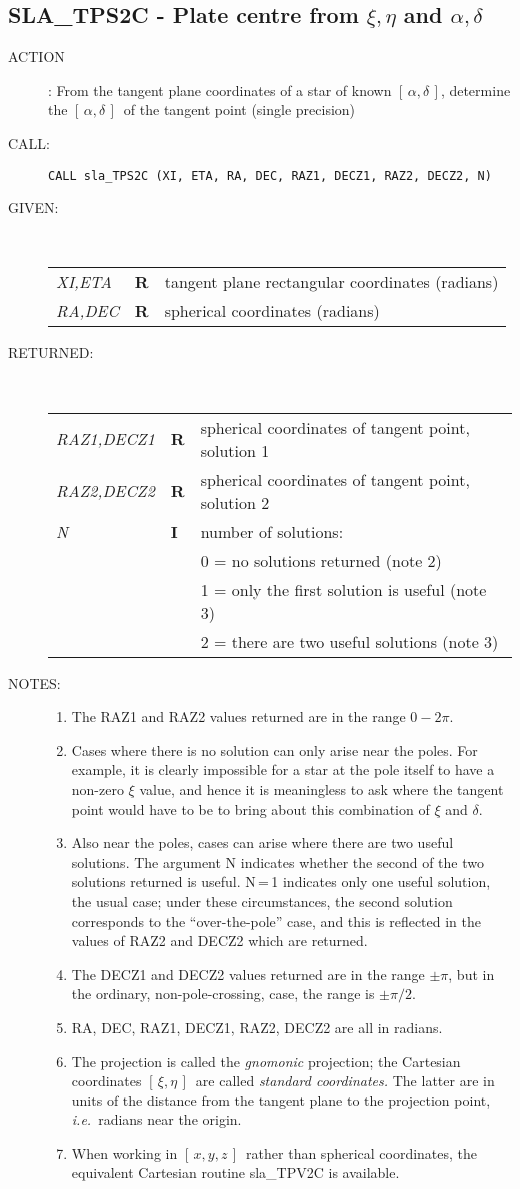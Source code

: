 \documentclass[11pt,twoside]{article}
\newcommand{\xlabel}[1]{}
\newcommand{\radec}     {$[\,\alpha,\delta\,]$}
\newcommand{\xieta}     {$[\,\xi,\eta\,]$}
\newcommand{\xyz}       {$[\,x,y,z\,]$}
\newcommand{\routine}[3]
{\hbadness=10000
  \vbox
  {
    \rule{\textwidth}{0.3mm}\\
    {\Large {\bf #1} \hfill #2 \hfill {\bf #1}}\\
    \setlength{\oldspacing}{\topsep}
    \setlength{\topsep}{0.3ex}
    \begin{description}
      #3
    \end{description}
    \setlength{\topsep}{\oldspacing}
  }
}
\renewcommand{\routine}[3]
   {
      \subsection{#1\xlabel{#1} - #2\label{#1}}
       \begin{description}
         #3
       \end{description}
   }
\newcommand{\action}[1]
{\item[ACTION]: #1}
\newcommand{\action}[1]
   {\item[ACTION:] #1}
\newcommand{\call}[1]
{\item[CALL]: \hspace{0.4em}{\tt #1}}
\newlength{\oldspacing}
\renewcommand{\call}[1]
   {
    \item[CALL:] {\tt #1}
   }
\newcommand{\args}[2]
{
  \goodbreak
  \setlength{\oldspacing}{\topsep}
  \setlength{\topsep}{0.3ex}
  \begin{description}
  \item[#1]:\\[1.5ex]
    \begin{tabular}{p{7em}p{6em}p{22em}}
      #2
    \end{tabular}
  \end{description}
  \setlength{\topsep}{\oldspacing}
}
\renewcommand{\args}[2]
   {
     \begin{description}
        \item[#1:]\\
        \begin{tabular}{p{7em}p{6em}l}
           #2
        \end{tabular}
     \end{description}
   }
\newcommand{\spec}[3]
{
  {\em {#1}} & {\bf \mbox{#2}} & {#3}
}
\newcommand{\notes}[1]
{
  \goodbreak
  \setlength{\oldspacing}{\topsep}
  \setlength{\topsep}{0.3ex}
  \begin{description}
    \item[NOTES]:
        #1
  \end{description}
  \setlength{\topsep}{\oldspacing}
}
\renewcommand{\notes}[1]
   {
      \begin{description}
         \item[NOTES:]
            #1
      \end{description}
   }
\begin{document}
\routine{SLA\_TPS2C}{Plate centre from $\xi,\eta$ and $\alpha,\delta$}
{
 \action{From the tangent plane coordinates of a star of known \radec,
        determine the \radec\ of the tangent point (single precision)}
 \call{CALL sla\_TPS2C (XI, ETA, RA, DEC, RAZ1, DECZ1, RAZ2, DECZ2, N)}
}
\args{GIVEN}
{
 \spec{XI,ETA}{R}{tangent plane rectangular coordinates (radians)} \\
 \spec{RA,DEC}{R}{spherical coordinates (radians)}
}
\args{RETURNED}
{
 \spec{RAZ1,DECZ1}{R}{spherical coordinates of tangent point,
                      solution 1} \\
 \spec{RAZ2,DECZ2}{R}{spherical coordinates of tangent point,
                      solution 2} \\
 \spec{N}{I}{number of solutions:} \\
 \spec{}{}{\hspace{1em} 0 = no solutions returned  (note 2)} \\
 \spec{}{}{\hspace{1em} 1 = only the first solution is useful (note 3)} \\
 \spec{}{}{\hspace{1em} 2 = there are two useful solutions (note 3)}
}
\notes
{
 \begin{enumerate}
  \item The RAZ1 and RAZ2 values returned are in the range $0\!-\!2\pi$.
  \item Cases where there is no solution can only arise near the poles.
        For example, it is clearly impossible for a star at the pole
        itself to have a non-zero $\xi$ value, and hence it is
        meaningless to ask where the tangent point would have to be
        to bring about this combination of $\xi$ and $\delta$.
  \item Also near the poles, cases can arise where there are two useful
        solutions.  The argument N indicates whether the second of the
        two solutions returned is useful.  N\,=\,1
        indicates only one useful solution, the usual case;  under
        these circumstances, the second solution corresponds to the
        ``over-the-pole'' case, and this is reflected in the values
        of RAZ2 and DECZ2 which are returned.
  \item The DECZ1 and DECZ2 values returned are in the range $\pm\pi$,
        but in the ordinary, non-pole-crossing, case, the range is
        $\pm\pi/2$.
  \item RA, DEC, RAZ1, DECZ1, RAZ2, DECZ2 are all in radians.
  \item The projection is called the {\it gnomonic}\/ projection;  the
        Cartesian coordinates \xieta\ are called 
        {\it standard coordinates.}\/  The latter
        are in units of the distance from the tangent plane to the projection
        point, {\it i.e.}\ radians near the origin.
  \item When working in \xyz\ rather than spherical coordinates, the
        equivalent Cartesian routine sla\_TPV2C is available.
 \end{enumerate}
}
\end{document}
